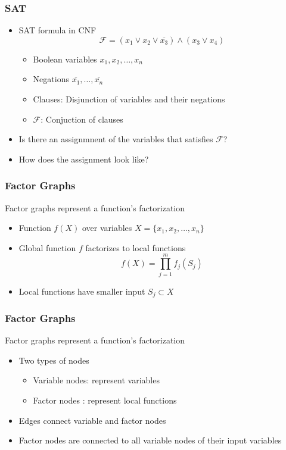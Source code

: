 \begin{frame}
	\frametitle{SAT}
\vspace{-0.5cm}
  \begin{itemize}
    \item SAT formula in CNF
    $$\mathcal{F} = (x_1 \lor x_2 \lor \overline{x_3}) \land (x_3 \lor x_4)$$
    \vspace{-0.5cm}
    	\begin{itemize}
    		\item Boolean variables $x_1, x_2, \ldots, x_n$
    		\item Negations $\overline{x_1}, \ldots, \overline{x_n}$
    		\item Clauses: Disjunction of variables and their negations
    		\item $\mathcal{F}$: Conjuction of clauses
    	\end{itemize}
    \item Is there an assignmnent of the variables that satisfies $\mathcal{F}$?
    \item How does the assignment look like?
  \end{itemize}
\end{frame}

\begin{frame}
	\frametitle{Factor Graphs}
	\vspace{-0.5cm}
		Factor graphs represent a function's factorization
		
		\begin{itemize}
			\item Function $f(X)$ over variables $X = \{x_1, x_2, \ldots, x_n\}$
			\item Global function $f$ factorizes to local functions
			$$ f(X) = \prod_{j=1}^m f_j(S_j)$$
			\item Local functions have smaller input $S_j \subset X$
		\end{itemize}
\end{frame}

\begin{frame}
	\frametitle{Factor Graphs}
		Factor graphs represent a function's factorization
		
		\begin{itemize}
			\item Two types of nodes
				\begin{itemize}
					\item Variable nodes: represent variables
					\item Factor nodes  : represent local functions
				\end{itemize}
			\item Edges connect variable and factor nodes
			\item Factor nodes are connected to all variable nodes of their input variables
		\end{itemize}
\end{frame}


